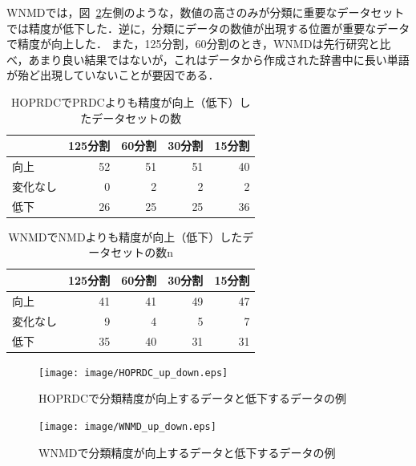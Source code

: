WNMDでは，図~\ref{fig:image/WNMD_up_down.eps}左側のような，数値の高さのみが分類に重要なデータセットでは精度が低下した．逆に，分類にデータの数値が出現する位置が重要なデータで精度が向上した．
また，125分割，60分割のとき，WNMDは先行研究と比べ，あまり良い結果ではないが，これはデータから作成された辞書中に長い単語が殆ど出現していないことが要因である．

\begin{table}[htbp]
\centering
\caption{HOPRDCでPRDCよりも精度が向上（低下）したデータセットの数}
\begin{tabular}{|l|r|r|r|r|}
\cline{2-5}    \multicolumn{1}{r|}{} &
\multicolumn{1}{c|}{125分割} &
\multicolumn{1}{c|}{60分割} &
\multicolumn{1}{c|}{30分割} &
\multicolumn{1}{c|}{15分割}
\bigstrut\\
\hline
向上 &
52 &
51 &
51 &
40
\bigstrut\\
\hline
変化なし &
0 &
2 &
2 &
2
\bigstrut\\
\hline
低下 &
26 &
25 &
25 &
36
\bigstrut\\
\hline
    \end{tabular}%
  \label{tab:HOPRDC_UP_AND_DOWN}%
\end{table}%

\begin{table}[htbp]
\centering
\caption{WNMDでNMDよりも精度が向上（低下）したデータセットの数n}
\begin{tabular}{|l|r|r|r|r|}
\cline{2-5}    \multicolumn{1}{r|}{} &
\multicolumn{1}{c|}{125分割} &
\multicolumn{1}{c|}{60分割} &
\multicolumn{1}{c|}{30分割} &
\multicolumn{1}{c|}{15分割}
\bigstrut\\
\hline
向上 &
41 &
41 &
49 &
47
\bigstrut\\
\hline
変化なし &
9 &
4 &
5 &
7
\bigstrut\\
\hline
低下 &
35 &
40 &
31 &
31
\bigstrut\\
\hline
    \end{tabular}%
  \label{tab:WNMD_UP_AND_DOWN}%
\end{table}%


% 
\begin{figure}[tb]
\begin{center}
\texttt{[image: image/HOPRDC\_up\_down.eps]}
\caption{HOPRDCで分類精度が向上するデータと低下するデータの例}
\label{fig:image/HOPRDC_up_down.eps}
\end{center}
\end{figure}
\begin{figure}[tb]
\begin{center}
\texttt{[image: image/WNMD\_up\_down.eps]}
\caption{WNMDで分類精度が向上するデータと低下するデータの例}
\label{fig:image/WNMD_up_down.eps}
\end{center}
\end{figure}

